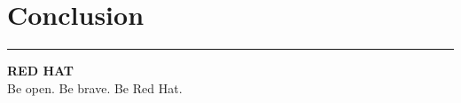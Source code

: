 \documentclass[11pt,a4paper]{article}
\begin{document}
\section{Conclusion}

\lipsum[3]

\vspace{1.5em}
\noindent\textcolor{RHRed}{\rule{\textwidth}{1.5pt}}

\vspace{0.5em}
\begin{center}
    \large\textbf{\textcolor{RHRed}{RED HAT}} \\[2pt]
    \small\textcolor{RHDarkGray}{Be open. Be brave. Be Red Hat.}
\end{center}
\end{document}
